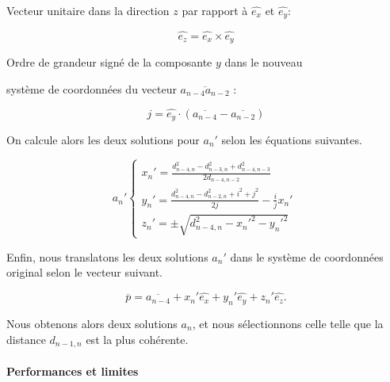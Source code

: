 \centerline{Vecteur unitaire dans la direction $z$ par rapport à $\hat{e_x}$ et $\hat{e_y}$:}
\[
\hat{e_z} = \hat{e_x}\times\hat{e_y}
\]

\vspace{0.4cm}

\centerline{Ordre de grandeur signé de la composante $y$ dans le nouveau}
\centerline{ système de coordonnées du vecteur $\overline{a_{n-4}a_{n-2}}$ : }
\[
j = \hat{e_y}\cdot(\overline{a_{n-4}}-\overline{a_{n-2}})
\]

\vspace{0.4cm}
\par On calcule alors les deux solutions pour $a_n'$ selon les équations suivantes.

\vspace{0.4cm}

\[
a_{n}'\left \{
   	\begin{array}{l}
      x_{n}'= \frac{d_{n-4,n}^2 - d_{n-3,n}^2 + d_{n-4,n-3}^2}{2d_{n-4,n-2}}\\
      y_{n}'= \frac{d_{n-4,n}^2 - d_{n-2,n}^2 + i^2 + j^2}{2j}-\frac{i}{j}x_{n}'\\
	  z_{n}'= \pm\sqrt{d_{n-4,n}^2 - x_{n}'^2 - y_{n}'^2}
   	\end{array}
   	\right .
   	\:
\]

\vspace{0.4cm}

\par Enfin, nous translatons les deux solutions $a_n'$ dans le système de coordonnées original selon le vecteur suivant.

\[
\overline{p} = \overline{a_{n-4}} + x_{n}'\hat{e_x} + y_{n}'\hat{e_y} + z_{n}'\hat{e_z}.
\]

\vspace{0.4cm}

Nous obtenons alors deux solutions $a_n$, et nous sélectionnons celle telle que la distance $d_{n-1,n}$ est la plus cohérente.


\paragraph{Performances et limites}
